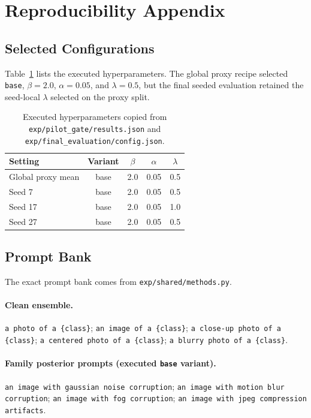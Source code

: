\documentclass{article}
\begin{document}
\appendix

\section{Reproducibility Appendix}

\subsection{Selected Configurations}
\label{app:config}

Table~\ref{tab:config} lists the executed hyperparameters. The global proxy recipe selected \texttt{base}, $\beta=2.0$, $\alpha=0.05$, and $\lambda=0.5$, but the final seeded evaluation retained the seed-local $\lambda$ selected on the proxy split.

\begin{table}[h]
\caption{Executed hyperparameters copied from \texttt{exp/pilot\_gate/results.json} and \texttt{exp/final\_evaluation/config.json}.}
\label{tab:config}
\centering
\small
\begin{tabular}{lcccc}
\toprule
Setting & Variant & $\beta$ & $\alpha$ & $\lambda$ \\
\midrule
Global proxy mean & base & 2.0 & 0.05 & 0.5 \\
Seed 7 & base & 2.0 & 0.05 & 0.5 \\
Seed 17 & base & 2.0 & 0.05 & 1.0 \\
Seed 27 & base & 2.0 & 0.05 & 0.5 \\
\bottomrule
\end{tabular}
\end{table}

\subsection{Prompt Bank}
\label{app:prompts}

The exact prompt bank comes from \texttt{exp/shared/methods.py}.

\paragraph{Clean ensemble.}
\texttt{a photo of a \{class\}};
\texttt{an image of a \{class\}};
\texttt{a close-up photo of a \{class\}};
\texttt{a centered photo of a \{class\}};
\texttt{a blurry photo of a \{class\}}.

\paragraph{Family posterior prompts (executed \texttt{base} variant).}
\texttt{an image with gaussian noise corruption};
\texttt{an image with motion blur corruption};
\texttt{an image with fog corruption};
\texttt{an image with jpeg compression artifacts}.
\end{document}
